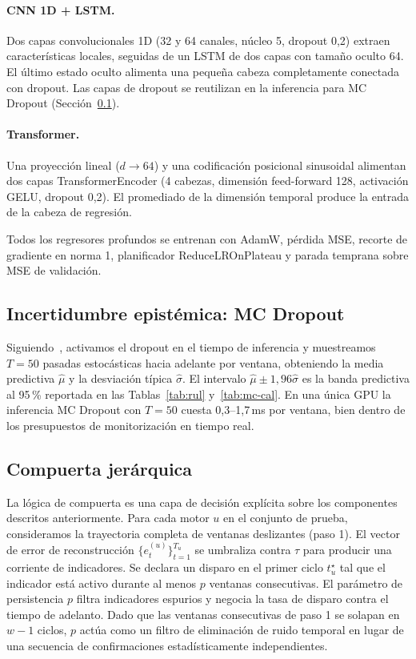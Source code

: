 \documentclass[5p,times,authoryear]{elsarticle}
\begin{document}
\paragraph{CNN 1D + LSTM.} Dos capas convolucionales 1D (32 y 64 canales, núcleo 5, dropout 0{,}2) extraen características locales, seguidas de un LSTM de dos capas con tamaño oculto 64. El último estado oculto alimenta una pequeña cabeza completamente conectada con dropout. Las capas de dropout se reutilizan en la inferencia para MC Dropout (Sección~\ref{sec:method-mc}).

\paragraph{Transformer.} Una proyección lineal ($d\to 64$) y una codificación posicional sinusoidal alimentan dos capas TransformerEncoder (4 cabezas, dimensión feed-forward 128, activación GELU, dropout 0{,}2). El promediado de la dimensión temporal produce la entrada de la cabeza de regresión.

Todos los regresores profundos se entrenan con AdamW, pérdida MSE, recorte de gradiente en norma 1, planificador ReduceLROnPlateau y parada temprana sobre MSE de validación.

\subsection{Incertidumbre epistémica: MC Dropout}\label{sec:method-mc}

Siguiendo~\citet{gal2016dropout}, activamos el dropout en el tiempo de inferencia y muestreamos $T=50$ pasadas estocásticas hacia adelante por ventana, obteniendo la media predictiva $\hat\mu$ y la desviación típica $\hat\sigma$. El intervalo $\hat\mu \pm 1{,}96\hat\sigma$ es la banda predictiva al 95\,\% reportada en las Tablas~\ref{tab:rul} y~\ref{tab:mc-cal}. En una única GPU la inferencia MC Dropout con $T{=}50$ cuesta 0{,}3--1{,}7\,ms por ventana, bien dentro de los presupuestos de monitorización en tiempo real.

\subsection{Compuerta jerárquica}\label{sec:method-gating}

La lógica de compuerta es una capa de decisión explícita sobre los componentes descritos anteriormente. Para cada motor $u$ en el conjunto de prueba, consideramos la trayectoria completa de ventanas deslizantes (paso 1). El vector de error de reconstrucción $\{e_t^{(u)}\}_{t=1}^{T_u}$ se umbraliza contra $\tau$ para producir una corriente de indicadores. Se declara un disparo en el primer ciclo $t^\star_u$ tal que el indicador está activo durante al menos $p$ ventanas consecutivas. El parámetro de persistencia $p$ filtra indicadores espurios y negocia la tasa de disparo contra el tiempo de adelanto. Dado que las ventanas consecutivas de paso 1 se solapan en $w-1$ ciclos, $p$ actúa como un filtro de eliminación de ruido temporal en lugar de una secuencia de confirmaciones estadísticamente independientes.
\end{document}
